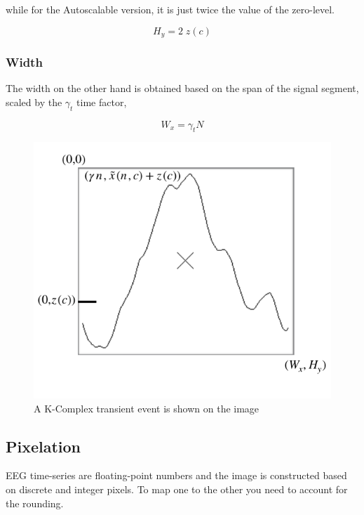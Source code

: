\noindent while for the Autoscalable version, it is just twice the value of the zero-level.

\begin{equation}
H_y = 2 \; z(c)
\label{eq:autoscaleheight}
\end{equation}


\subsubsection{Width}

The width on the other hand is obtained based on the span of the signal segment, scaled by the $\gamma_t$  time factor,

\begin{equation}
W_x = \gamma_t  N
\label{eq:standarizedaverages}
\end{equation}

\begin{figure}[]
\centering
\includegraphics[scale=1]{images/imagecoordinatesystem.pdf}
\caption[Image Coordinate System]{A K-Complex transient event is shown on the image }
\label{fig:imagecoordinatesystem}
\end{figure}

\subsection{Pixelation}

EEG time-series are floating-point numbers and the image is constructed based on discrete and integer pixels.  To map one to the other you need to account for the rounding.


